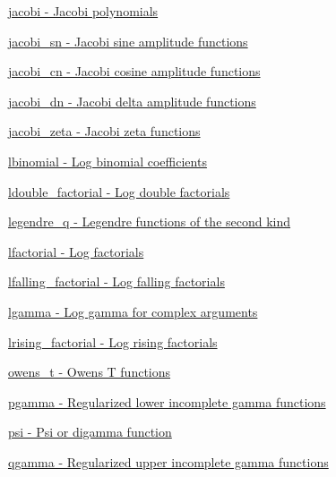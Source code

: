 \begin{DoxyItemize}
\item \hyperlink{group__gnu__math__spec__func_ga3dea9ec3774ee5db50276597bbfb0afa}{jacobi -\/ Jacobi polynomials}
\item \hyperlink{group__gnu__math__spec__func_ga5e39ec723669e132e27980dfdf766c19}{jacobi\+\_\+sn -\/ Jacobi sine amplitude functions}
\item \hyperlink{group__gnu__math__spec__func_ga51512996a910489b4554daa7507a48f1}{jacobi\+\_\+cn -\/ Jacobi cosine amplitude functions}
\item \hyperlink{group__gnu__math__spec__func_ga4c2e5ff17abaab5217d4dbcbfd7366d8}{jacobi\+\_\+dn -\/ Jacobi delta amplitude functions}
\item \hyperlink{group__gnu__math__spec__func_gafe1fc209cfe90ceee3b42e077a922045}{jacobi\+\_\+zeta -\/ Jacobi zeta functions}
\item \hyperlink{group__gnu__math__spec__func_ga40d19a09e31feb1ee619e11780113c58}{lbinomial -\/ Log binomial coefficients}
\item \hyperlink{group__gnu__math__spec__func_ga31ca8e7a5b1f5c883e727ed9c053edd8}{ldouble\+\_\+factorial -\/ Log double factorials}
\item \hyperlink{group__gnu__math__spec__func_ga4ad68133a4ff354cb99e4d3608ce6e4d}{legendre\+\_\+q -\/ Legendre functions of the second kind}
\item \hyperlink{group__gnu__math__spec__func_gaee28cc03db944a3e02fd10542016cfa8}{lfactorial -\/ Log factorials}
\item \hyperlink{group__gnu__math__spec__func_ga7190df10af767718f1862e804a2d7129}{lfalling\+\_\+factorial -\/ Log falling factorials}
\item \hyperlink{group__gnu__math__spec__func_ga3a5c8ad2a513470bd71be1bb14439945}{lgamma -\/ Log gamma for complex arguments}
\item \hyperlink{group__gnu__math__spec__func_ga86158caf7d3e8b439599a12953af9844}{lrising\+\_\+factorial -\/ Log rising factorials}
\item \hyperlink{group__gnu__math__spec__func_gaa6ca4f2127c6c2101dc360673304cc2c}{owens\+\_\+t -\/ Owens T functions}
\item \hyperlink{group__gnu__math__spec__func_gaa78927de2c62e6c63f4b3506f5e1a8f6}{pgamma -\/ Regularized lower incomplete gamma functions}
\item \hyperlink{group__gnu__math__spec__func_gaae7574990cdbb6a637d39c2c036928c0}{psi -\/ Psi or digamma function}
\item \hyperlink{group__gnu__math__spec__func_ga3ef7aeaa55f9e7b02f02d1d605a716a6}{qgamma -\/ Regularized upper incomplete gamma functions}

\end{DoxyItemize}
